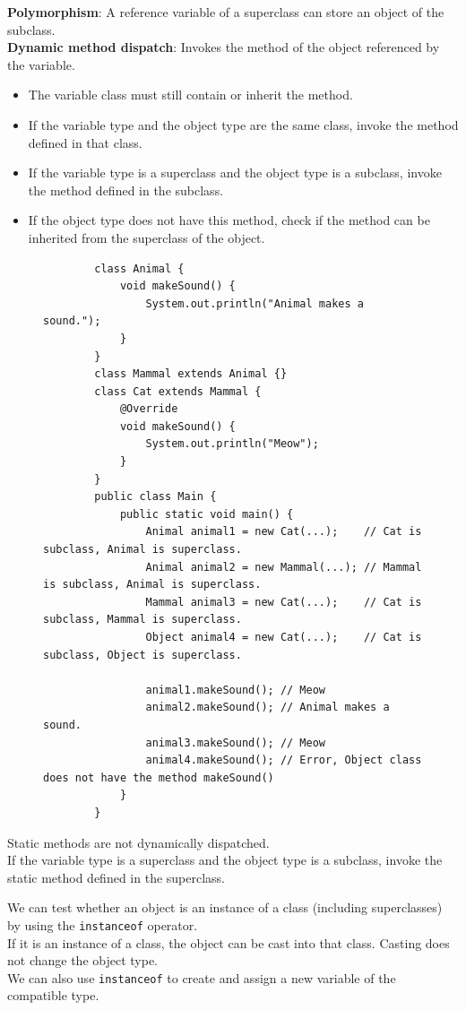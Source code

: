 \documentclass{article}
\begin{document}
\textbf{Polymorphism}: A reference variable of a superclass can store an object of the subclass.\\
\textbf{Dynamic method dispatch}: Invokes the method of the object referenced by the variable.
\begin{itemize}
	\item The variable class must still contain or inherit the method.
	\item If the variable type and the object type are the same class, invoke the method defined in that class.
	\item If the variable type is a superclass and the object type is a subclass, invoke the method defined in the subclass.
	\item If the object type does not have this method, check if the method can be inherited from the superclass of the object.
\end{itemize}

\begin{figure}[h]
	\begin{verbatim}
		class Animal {
		    void makeSound() {
		        System.out.println("Animal makes a sound.");
		    }
		}
		class Mammal extends Animal {}
		class Cat extends Mammal {
		    @Override
		    void makeSound() {
		        System.out.println("Meow");
		    }
		}
		public class Main {
		    public static void main() {
		        Animal animal1 = new Cat(...);    // Cat is subclass, Animal is superclass.
		        Animal animal2 = new Mammal(...); // Mammal is subclass, Animal is superclass.
		        Mammal animal3 = new Cat(...);    // Cat is subclass, Mammal is superclass.
		        Object animal4 = new Cat(...);    // Cat is subclass, Object is superclass.
		        
		        animal1.makeSound(); // Meow
		        animal2.makeSound(); // Animal makes a sound.
		        animal3.makeSound(); // Meow
		        animal4.makeSound(); // Error, Object class does not have the method makeSound()
		    }
		}
	\end{verbatim}
\end{figure}

Static methods are not dynamically dispatched.\\
If the variable type is a superclass and the object type is a subclass, invoke the static method defined in the superclass.

\newpage

We can test whether an object is an instance of a class (including superclasses) by using the \texttt{instanceof} operator.\\
If it is an instance of a class, the object can be cast into that class. Casting does not change the object type.\\
We can also use \texttt{instanceof} to create and assign a new variable of the compatible type.
\end{document}
